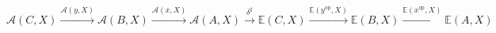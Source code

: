 \documentclass[preview]{standalone}
\begin{document}
\begin{center}
$$\mathscr{A}(C,X) \xrightarrow{\mathscr{A}(y,X)} \mathscr{A}(B,X) \xrightarrow{\mathscr{A}(x,X)} \mathscr{A}(A,X) \xrightarrow{\delta^\sharp} \mathbb{E}(C,X) \xrightarrow{\mathbb{E}(y^\text{op},X)} \mathbb{E}(B,X) \xrightarrow{\mathbb{E}(x^\text{op},X)} \mathbb{E}(A,X)$$
\end{center}
\end{document}
